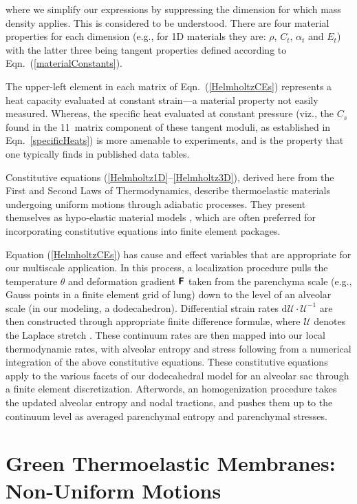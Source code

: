 where we simplify our expressions by suppressing the dimension for which mass density applies.  This is considered to be understood.  There are four material properties for each dimension (e.g., for 1D materials they are: $\rho$, $C_t$, $\alpha_t$ and $E_t$) with the latter three being tangent properties defined according to Eqn.~(\ref{materialConstants}).

The upper-left element in each matrix of Eqn.~(\ref{HelmholtzCEs}) represents a heat capacity evaluated at constant strain---a material property not easily measured.  Whereas, the specific heat evaluated at constant pressure (viz., the $C_s$ found in the 11~matrix component of these tangent moduli, as established in Eqn.~\ref{specificHeats}) is more amenable to experiments, and is the property that one typically finds in published data tables.  

Constitutive equations (\ref{Helmholtz1D}--\ref{Helmholtz3D}), derived here from the First and Second Laws of Thermo\-dynamics, describe thermo\-elastic materials undergoing uniform motions through adiabatic processes.  They present themselves as hypo-elastic material models \cite{Truesdell55}, which are often preferred for incorporating constitutive equations into finite element packages.

Equation (\ref{HelmholtzCEs}) has cause and effect variables that are appropriate for our multi\-scale application.  In this process, a localization procedure pulls the temperature $\theta$ and deformation gradient $\boldsymbol{\mathsf{F}}$ taken from the parenchyma scale (e.g., Gauss points in a finite element grid of lung) down to the level of an alveolar scale (in our modeling, a dodecahedron).  Differential strain rates $\mathrm{d} \boldsymbol{\mathcal{U}} \cdot \boldsymbol{\mathcal{U}}^{-1}$ are then constructed through appropriate finite difference formul\ae, where $\boldsymbol{\mathcal{U}}$ denotes the Laplace stretch \cite{Freedetal19}. These continuum rates are then mapped into our local thermo\-dynamic rates, with alveolar entropy and stress following from a numerical integration of the above constitutive equations.  These constitutive equations apply to the various facets of our dodecahedral model for an alveolar sac through a finite element discretization.  Afterwords, an homogenization procedure takes the updated alveolar entropy and nodal tractions, and pushes them up to the continuum level as averaged parenchymal entropy and parenchymal stresses. 

\section{Green Thermoelastic Membranes: Non-Uniform Motions}
\label{secNonuniform2D}

